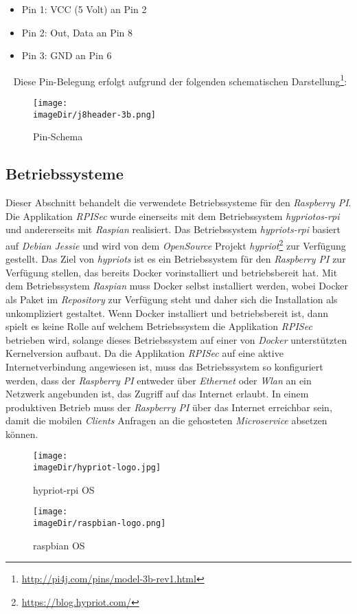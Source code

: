 \begin{itemize}
	\item Pin 1: VCC (5 Volt) an Pin 2
	\item Pin 2: Out, Data an Pin 8
	\item Pin 3: GND an Pin 6
\end{itemize}
\ \newline
Diese Pin-Belegung erfolgt aufgrund der folgenden schematischen Darstellung\footnote{\url{http://pi4j.com/pins/model-3b-rev1.html}}:

\begin{figure}[h]
	\centering
	\texttt{[image: \\imageDir/j8header-3b.png]}
	\caption{Pin-Schema}
	\label{fig:j8header-3b}
\end{figure}
\newpage

\subsection{Betriebssysteme}
Dieser Abschnitt behandelt die verwendete Betriebssysteme für den \emph{Raspberry PI}. Die Applikation \emph{RPISec} wurde einerseits mit dem Betriebssystem \emph{hypriotos-rpi} und andererseits mit \emph{Raspian} realisiert. Das Betriebssystem \emph{hypriots-rpi} basiert auf \emph{Debian Jessie} und wird von dem \emph{OpenSource} Projekt \emph{hypriot}\footnote{\url{https://blog.hypriot.com/}} zur Verfügung gestellt. Das Ziel von \emph{hypriots} ist es ein Betriebssystem für den \emph{Raspberry PI} zur Verfügung stellen, das bereits Docker vorinstalliert und betriebsbereit hat. Mit dem Betriebssystem \emph{Raspian} muss Docker selbst installiert werden, wobei Docker als Paket im \emph{Repository} zur Verfügung steht und daher sich die Installation als unkompliziert gestaltet.
\newline
\newline
Wenn Docker installiert und betriebsbereit ist, dann spielt es keine Rolle auf welchem Betriebssystem die Applikation \emph{RPISec} betrieben wird, solange dieses Betriebssystem auf einer von \emph{Docker} unterstützten Kernelversion aufbaut.
\newline
\newline
Da die Applikation \emph{RPISec} auf eine aktive Internetverbindung angewiesen ist, muss das Betriebssystem so konfiguriert werden, dass der \emph{Raspberry PI} entweder über \emph{Ethernet} oder \emph{Wlan} an ein Netzwerk angebunden ist, das Zugriff auf das Internet erlaubt. In einem produktiven Betrieb muss der \emph{Raspberry PI} über das Internet erreichbar sein, damit die mobilen \emph{Clients} Anfragen an die gehosteten \emph{Microservice} absetzen können.
\begin{figure}[h]
	\centering
	\texttt{[image: \\imageDir/hypriot-logo.jpg]}
	\caption{hypriot-rpi OS}
	\label{fig:j8header-3b}
\end{figure}\begin{figure}[h]
	\centering
	\texttt{[image: \\imageDir/raspbian-logo.png]}
	\caption{raspbian OS}
	\label{fig:j8header-3b}
\end{figure}